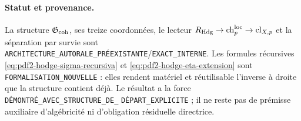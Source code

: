 \paragraph{Statut et provenance.}
La structure $\mathfrak G_{\rm coh}$, ses treize coordonnées, le lecteur
$R_{\rm Hdg}\to\operatorname{ch}^{\rm loc}_p\to\operatorname{cl}_{X,p}$
et la séparation par survie sont
\texttt{ARCHITECTURE\_AUTORALE\_PRÉEXISTANTE}/\texttt{EXACT\_INTERNE}.
Les formules récursives
\eqref{eq:pdf2-hodge-sigma-recursiva} et
\eqref{eq:pdf2-hodge-eta-extension} sont
\texttt{FORMALISATION\_NOUVELLE} : elles rendent matériel et réutilisable l'inverse à droite
que la structure contient déjà. Le résultat a la force
\texttt{DÉMONTRÉ\_AVEC\_STRUCTURE\_DE\_}\allowbreak
\texttt{DÉPART\_EXPLICITE} ; il ne reste pas de
prémisse auxiliaire d'algébricité ni d'obligation résiduelle directrice.
